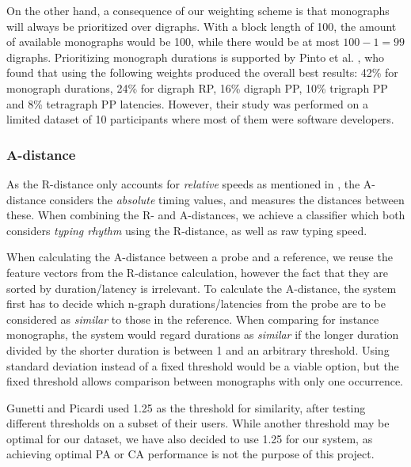 On the other hand, a consequence of our weighting scheme is that monographs will always be prioritized over digraphs.
With a block length of 100, the amount of available monographs would be 100, while there would be at most $100 - 1 = 99$ digraphs.
Prioritizing monograph durations is supported by Pinto et al. \cite{Pinto2014}, who found that using the following weights produced the overall best results: 42\% for monograph durations, 24\% for digraph RP, 16\% digraph PP, 10\% trigraph PP and 8\% tetragraph PP latencies.
However, their study was performed on a limited dataset of 10 participants where most of them were software developers.

\subsubsection{A-distance}
As the R-distance only accounts for \textit{relative} speeds as mentioned in , the A-distance considers the \textit{absolute} timing values, and measures the distances between these.
When combining the R- and A-distances, we achieve a classifier which both considers \textit{typing rhythm} using the R-distance, as well as raw typing speed.

When calculating the A-distance between a probe and a reference, we reuse the feature vectors from the R-distance calculation, however the fact that they are sorted by duration/latency is irrelevant.
To calculate the A-distance, the system first has to decide which n-graph durations/latencies from the probe are to be considered as \textit{similar} to those in the reference.
When comparing for instance monographs, the system would regard durations as \textit{similar} if the longer duration divided by the shorter duration is between 1 and an arbitrary threshold.
Using standard deviation instead of a fixed threshold would be a viable option, but the fixed threshold allows comparison between monographs with only one occurrence.

Gunetti and Picardi \cite{gnp} used 1.25 as the threshold for similarity, after testing different thresholds on a subset of their users.
While another threshold may be optimal for our dataset, we have also decided to use 1.25 for our system, as achieving optimal PA or CA performance is not the purpose of this project.

